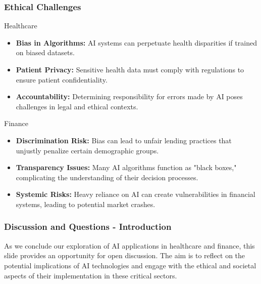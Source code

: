 \documentclass[aspectratio=169]{beamer}
\begin{document}
\begin{frame}[fragile]
    \frametitle{Ethical Challenges}
    \begin{block}{Healthcare}
        \begin{itemize}
            \item \textbf{Bias in Algorithms:} AI systems can perpetuate health disparities if trained on biased datasets.
            \item \textbf{Patient Privacy:} Sensitive health data must comply with regulations to ensure patient confidentiality.
            \item \textbf{Accountability:} Determining responsibility for errors made by AI poses challenges in legal and ethical contexts.
        \end{itemize}
    \end{block}
    
    \begin{block}{Finance}
        \begin{itemize}
            \item \textbf{Discrimination Risk:} Bias can lead to unfair lending practices that unjustly penalize certain demographic groups.
            \item \textbf{Transparency Issues:} Many AI algorithms function as "black boxes," complicating the understanding of their decision processes.
            \item \textbf{Systemic Risks:} Heavy reliance on AI can create vulnerabilities in financial systems, leading to potential market crashes.
        \end{itemize}
    \end{block}
\end{frame}

\begin{frame}[fragile]
    \frametitle{Discussion and Questions - Introduction}
    As we conclude our exploration of AI applications in healthcare and finance, this slide provides an opportunity for open discussion. The aim is to reflect on the potential implications of AI technologies and engage with the ethical and societal aspects of their implementation in these critical sectors.
\end{frame}
\end{document}
